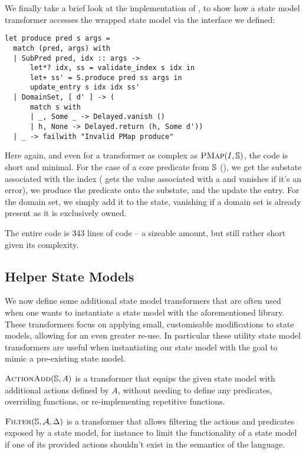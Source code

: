 We finally take a brief look at the implementation of , to show how a state model transformer accesses the wrapped state model via the interface we defined: \begin{lstlisting}
let produce pred s args =
  match (pred, args) with
  | SubPred pred, idx :: args ->
      let*? idx, ss = validate_index s idx in
      let+ ss' = S.produce pred ss args in
      update_entry s idx idx ss'
  | DomainSet, [ d' ] -> (
      match s with
      | _, Some _ -> Delayed.vanish ()
      | h, None -> Delayed.return (h, Some d'))
  | _ -> failwith "Invalid PMap produce"
\end{lstlisting}
Here again, and even for a transformer as complex as $\textsc{PMap}(I,\mathbb S)$, the code is short and minimal. For the case of a core predicate from $\mathbb S$ (), we get the substate associated with the index ( gets the value associated with a  and vanishes if it's an error), we produce the predicate onto the substate, and the update the entry. For the domain set, we simply add it to the state, vanishing if a domain set is already present as it is exclusively owned.

The entire \PMap{} code is 343 lines of code -- a sizeable amount, but still rather short given its complexity.

\subsection{Helper State Models}

We now define some additional state model transformers that are often used when one wants to instantiate a state model with the aforementioned library. These transformers focus on applying small, customisable modifications to state models, allowing for an even greater re-use. In particular these utility state model transformers are useful when instantiating our state model with the goal to mimic a pre-existing state model.

$\textsc{ActionAdd}(\mathbb S, A)$ is a transformer that equips the given state model with additional actions defined by $A$, without needing to define any predicates, overriding functions, or re-implementing repetitive functions.

$\textsc{Filter}(\mathbb S, {\cal{A}}, \Delta)$ is a transformer that allows filtering the actions and predicates exposed by a state model, for instance to limit the functionality of a state model if one of its provided actions shouldn't exist in the semantics of the language.

